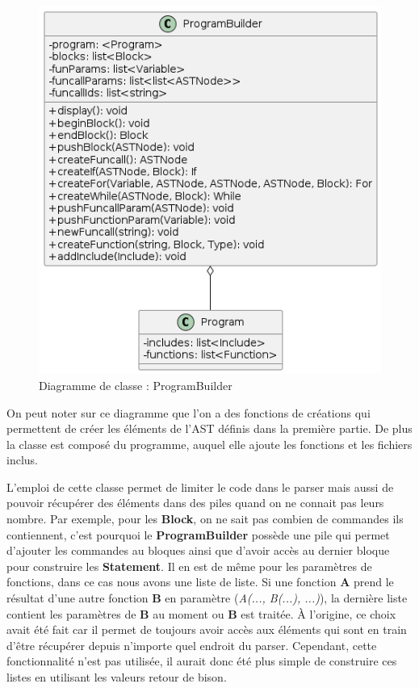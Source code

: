 \documentclass[a4paper]{article}%
\begin{document}
\begin{figure}[h]
  \begin{center}
  \includegraphics[scale=0.5]{../ressources/diagrams/program-builder.png}
  \caption{Diagramme de classe : ProgramBuilder}
  \end{center}
\end{figure}

On peut noter sur ce diagramme que l'on a des fonctions de créations qui
permettent de créer les éléments de l'AST définis dans la première partie. De
plus la classe est composé du programme, auquel elle ajoute les fonctions et les
fichiers inclus. %

L'emploi de cette classe permet de limiter le code dans le \gls{parser} mais aussi de
pouvoir récupérer des éléments dans des piles quand on ne connait pas leurs
nombre. Par exemple, pour les \textbf{Block}, on ne sait pas combien de
commandes ils contiennent, c'est pourquoi le \textbf{ProgramBuilder} possède une
pile qui permet d'ajouter les commandes au bloques ainsi que d'avoir accès au
dernier bloque pour construire les \textbf{Statement}. Il en est de même pour
les paramètres de fonctions, dans ce cas nous avons une liste de liste. Si une
fonction \textbf{A} prend le résultat d'une autre fonction \textbf{B} en
paramètre (\textit{A(..., B(...), ...)}), la dernière liste contient les
paramètres de \textbf{B} au moment ou \textbf{B} est traitée. À l'origine, ce
choix avait été fait car il permet de toujours avoir accès aux éléments qui sont
en train d'être récupérer depuis n'importe quel endroit du \gls{parser}. Cependant,
cette fonctionnalité n'est pas utilisée, il aurait donc été plus simple de
construire ces listes en utilisant les valeurs retour de bison.\\
\end{document}
